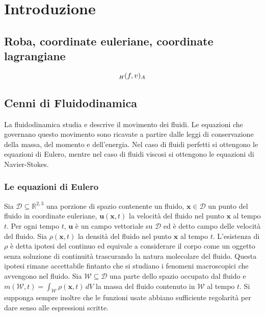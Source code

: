 \documentclass{book}
\begin{document}
\chapter{Introduzione}

\section{Roba, coordinate euleriane, coordinate lagrangiane}

$$\ps{f}{v}[H][A]$$

\section{Cenni di Fluidodinamica}

La fluidodinamica studia e descrive il movimento dei fluidi. Le equazioni che governano questo movimento sono ricavate a partire dalle leggi di conservazione della massa, del momento e dell'energia. Nel caso di fluidi perfetti si ottengono le equazioni di Eulero, mentre nel caso di fluidi viscosi si ottengono le equazioni di Navier-Stokes.

\subsection{Le equazioni di Eulero}

Sia $\mathcal{D} \subseteq \mathbb{R}^{2,3}$ una porzione di spazio contenente un fluido, $\mathbf{x} \in \mathcal{D}$ un punto del fluido in coordinate euleriane, $\mathbf{u}(\mathbf{x},t)$ la velocità del fluido nel punto $\mathbf{x}$ al tempo $t$. Per ogni tempo $t$, $\mathbf{u}$ è un campo vettoriale su $\mathcal{D}$ ed è detto campo delle velocità del fluido. Sia $\rho(\mathbf{x},t)$ la densità del fluido nel punto $\mathbf{x}$ al tempo $t$.  L'esistenza di $\rho$ è detta ipotesi del continuo ed equivale a considerare il corpo come un oggetto senza soluzione di continuità trascurando la natura molecolare del fluido. Questa ipotesi rimane accettabile fintanto che si studiano i fenomeni macroscopici che avvengono nel fluido. Sia $\mathcal{W} \subseteq \mathcal{D}$ una parte dello spazio occupato dal fluido e $m(\mathcal{W},t)= \int_{\mathcal{W}}\rho(\mathbf{x},t) \, dV$ la massa del fluido contenuto in $\mathcal{W}$ al tempo $t$. Si supponga sempre inoltre che le funzioni usate abbiano sufficiente regolarità per dare senso alle espressioni scritte. 
\end{document}
